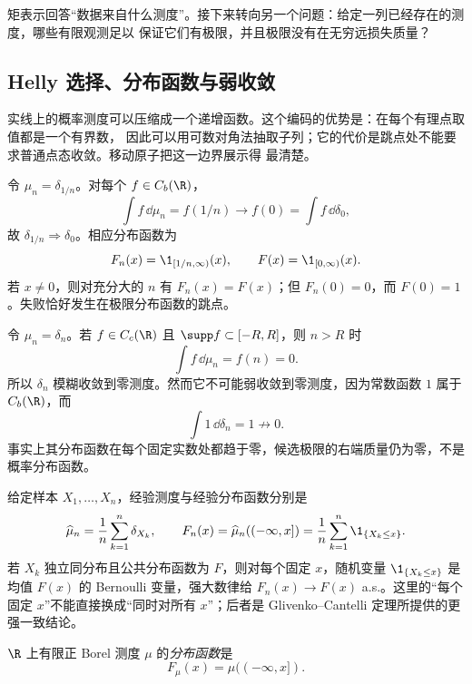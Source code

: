 矩表示回答“数据来自什么测度”。接下来转向另一个问题：给定一列已经存在的测度，哪些有限观测足以
保证它们有极限，并且极限没有在无穷远损失质量？

\subsection{Helly 选择、分布函数与弱收敛}\label{subsec:7-3-2}

实线上的概率测度可以压缩成一个递增函数。这个编码的优势是：在每个有理点取值都是一个有界数，
因此可以用可数对角法抽取子列；它的代价是跳点处不能要求普通点态收敛。移动原子把这一边界展示得
最清楚。

\begin{example}[移动 Dirac]\label{ex:7-3-2-1}
令 $\mu_n=\delta_{1/n}$。对每个 $f\in C_b(\R)$，
\[
 \int f\,\dd\mu_n=f(1/n)\longrightarrow f(0)=\int f\,\dd\delta_0,
\]
故 $\delta_{1/n}\Rightarrow\delta_0$。相应分布函数为
\[
 F_n(x)=\1_{[1/n,\infty)}(x),
 \qquad F(x)=\1_{[0,\infty)}(x).
\]
若 $x\neq0$，则对充分大的 $n$ 有 $F_n(x)=F(x)$；但
$F_n(0)=0$，而 $F(0)=1$。失败恰好发生在极限分布函数的跳点。
\end{example}

\begin{example}[质量逃逸]\label{ex:7-3-2-2}
令 $\mu_n=\delta_n$。若 $f\in C_c(\R)$ 且 $\supp f\subset[-R,R]$，则 $n>R$ 时
\[
 \int f\,\dd\mu_n=f(n)=0.
\]
所以 $\delta_n$ 模糊收敛到零测度。然而它不可能弱收敛到零测度，因为常数函数 $1$ 属于
$C_b(\R)$，而
\[
 \int1\,\dd\delta_n=1\not\longrightarrow0.
\]
事实上其分布函数在每个固定实数处都趋于零，候选极限的右端质量仍为零，不是概率分布函数。
\end{example}

\begin{example}[经验分布函数]\label{ex:7-3-2-3}
给定样本 $X_1,\ldots,X_n$，经验测度与经验分布函数分别是
\[
 \widehat\mu_n=\frac1n\sum_{k=1}^n\delta_{X_k},
 \qquad
 F_n(x)=\widehat\mu_n(( -\infty,x])
       =\frac1n\sum_{k=1}^n\1_{\{X_k\leq x\}}.
\]
若 $X_k$ 独立同分布且公共分布函数为 $F$，则对每个固定 $x$，随机变量
$\1_{\{X_k\leq x\}}$ 是均值 $F(x)$ 的 Bernoulli 变量，强大数律给
$F_n(x)\to F(x)$ a.s.。这里的“每个固定 $x$”不能直接换成“同时对所有 $x$”；后者是
Glivenko--Cantelli 定理所提供的更强一致结论。
\end{example}

\begin{definition}[分布函数]\label{def:7-3-2-1}
$\R$ 上有限正 Borel 测度 $\mu$ 的\emph{分布函数}是
\[
 F_\mu(x)=\mu(( -\infty,x]).
\]
\end{definition}


